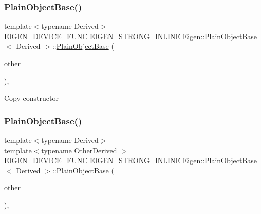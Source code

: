 \subsubsection{\texorpdfstring{PlainObjectBase()}{PlainObjectBase()}\hspace{0.1cm}{\footnotesize\ttfamily [1/3]}}
{\footnotesize\ttfamily template$<$typename Derived$>$ \\
E\+I\+G\+E\+N\+\_\+\+D\+E\+V\+I\+C\+E\+\_\+\+F\+U\+NC E\+I\+G\+E\+N\+\_\+\+S\+T\+R\+O\+N\+G\+\_\+\+I\+N\+L\+I\+NE \mbox{\hyperlink{class_eigen_1_1_plain_object_base}{Eigen\+::\+Plain\+Object\+Base}}$<$ Derived $>$\+::\mbox{\hyperlink{class_eigen_1_1_plain_object_base}{Plain\+Object\+Base}} (\begin{DoxyParamCaption}\item[{const \mbox{\hyperlink{class_eigen_1_1_plain_object_base}{Plain\+Object\+Base}}$<$ Derived $>$ \&}]{other }\end{DoxyParamCaption})\hspace{0.3cm}{\ttfamily [inline]}, {\ttfamily [protected]}}

Copy constructor \mbox{\label{class_eigen_1_1_plain_object_base_a82cdb1b9d5c90c2002cb5086c03c29fa}} 
\subsubsection{\texorpdfstring{PlainObjectBase()}{PlainObjectBase()}\hspace{0.1cm}{\footnotesize\ttfamily [2/3]}}
{\footnotesize\ttfamily template$<$typename Derived$>$ \\
template$<$typename Other\+Derived $>$ \\
E\+I\+G\+E\+N\+\_\+\+D\+E\+V\+I\+C\+E\+\_\+\+F\+U\+NC E\+I\+G\+E\+N\+\_\+\+S\+T\+R\+O\+N\+G\+\_\+\+I\+N\+L\+I\+NE \mbox{\hyperlink{class_eigen_1_1_plain_object_base}{Eigen\+::\+Plain\+Object\+Base}}$<$ Derived $>$\+::\mbox{\hyperlink{class_eigen_1_1_plain_object_base}{Plain\+Object\+Base}} (\begin{DoxyParamCaption}\item[{const \mbox{\hyperlink{class_eigen_1_1_dense_base}{Dense\+Base}}$<$ Other\+Derived $>$ \&}]{other }\end{DoxyParamCaption})\hspace{0.3cm}{\ttfamily [inline]}, {\ttfamily [protected]}}

